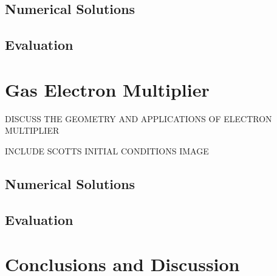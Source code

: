 \documentclass{article}
\begin{document}
\subsection{Numerical Solutions}



\subsection{Evaluation}



\section{Gas Electron Multiplier}

DISCUSS THE GEOMETRY AND APPLICATIONS OF ELECTRON MULTIPLIER

INCLUDE SCOTTS INITIAL CONDITIONS IMAGE




\subsection{Numerical Solutions}



\subsection{Evaluation}



\section{Conclusions and Discussion}
\end{document}
